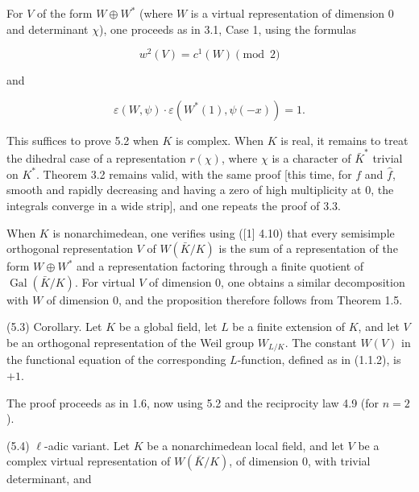\documentclass[9pt,twoside]{extarticle}
\begin{document}
{For \(V\) of the form \(W\oplus W^*\) (where \(W\) is a virtual representation of dimension 0 and determinant \(\chi\)), one proceeds as in 3.1, Case 1, using the formulas\par

\[
w^2(V)=c^1(W)\pmod2
\]

and\par

\[
\varepsilon(W,\psi)\cdot\varepsilon(W^*(1),\psi(-x))=1.
\]

This suffices to prove 5.2 when \(K\) is complex. When \(K\) is real, it remains to treat the dihedral case of a representation \(r(\chi)\), where \(\chi\) is a character of \(\bar K^*\) trivial on \(K^*\). Theorem 3.2 remains valid, with the same proof [this time, for \(f\) and \(\hat f\), smooth and rapidly decreasing and having a zero of high multiplicity at 0, the integrals converge in a wide strip], and one repeats the proof of 3.3.\par

When \(K\) is nonarchimedean, one verifies using ([1] 4.10) that every semisimple orthogonal representation \(V\) of \(W(\bar K/K)\) is the sum of a representation of the form \(W\oplus W^*\) and a representation factoring through a finite quotient of \(\operatorname{Gal}(\bar K/K)\). For virtual \(V\) of dimension 0, one obtains a similar decomposition with \(W\) of dimension 0, and the proposition therefore follows from Theorem 1.5.\par

(5.3) Corollary. Let \(K\) be a global field, let \(L\) be a finite extension of \(K\), and let \(V\) be an orthogonal representation of the Weil group \(W_{L/K}\). The constant \(W(V)\) in the functional equation of the corresponding \(L\)-function, defined as in (1.1.2), is \(+1\).\par

The proof proceeds as in 1.6, now using 5.2 and the reciprocity law 4.9 (for \(n=2\)).\par

(5.4) \(\ell\)-adic variant. Let \(K\) be a nonarchimedean local field, and let \(V\) be a complex virtual representation of \(W(\bar K/K)\), of dimension 0, with trivial determinant, and\par
}
\end{document}

